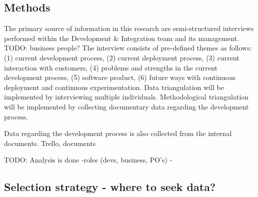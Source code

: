 \documentclass[english]{tktltiki2}
\theoremstyle{definition}
\theoremstyle{remark}
\begin{document}
\subsection{Methods} %
The primary source of information in this research are semi-structured interviews performed within the Development & Integration team and its management. TODO: business people? The interview consists of pre-defined themes as follows: (1) current development process, (2) current deployment process, (3) current interaction with customers, (4) problems and strengths in the current development process, (5) software product, (6) future ways with continuous deployment and continuous experimentation. Data triangulation will be implemented by interviewing multiple individuals. Methodological triangulation will be implemented by collecting documentary data regarding the development process.

Data regarding the development process is also collected from the internal documents.
Trello, documents

TODO: Analysis is done
 -roles (devs, business, PO's)
 -


\subsection{Selection strategy - where to seek data?}
\end{document}

